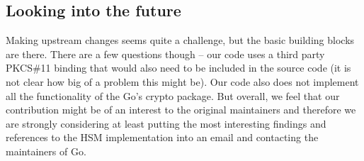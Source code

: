 \documentclass[a4paper]{scrartcl}
\begin{document}
\subsection{Looking into the future}
Making upstream changes seems quite a challenge, but the basic building blocks are there. There are a few questions though -- our code uses a third party PKCS\#11 binding that would also need to be included in the source code (it is not clear how big of a problem this might be). Our code also does not implement all the functionality of the Go's crypto package. But overall, we feel that our contribution might be of an interest to the original maintainers and therefore we are strongly considering at least putting the most interesting findings and references to the HSM implementation into an email and contacting the maintainers of Go.





\end{document}
